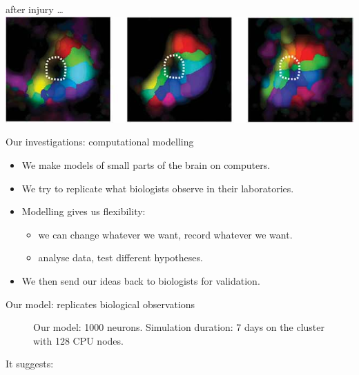 \begin{frame}[c]{after injury \ldots}
    \includegraphics[width=\textwidth]{99_images/keck-1-2c}%
\end{frame}
\begin{frame}[c]{Our investigations: computational modelling}
  \begin{itemize}
    \item We make \alert{models of small parts of the brain} on computers.
    \item We try to \alert{replicate} what biologists observe in their laboratories.
      \pause{}
    \item Modelling gives us \alert{flexibility}:
      \begin{itemize}
        \item we can change whatever we want, record whatever we want.
        \item analyse data, test different hypotheses.
      \end{itemize}
      \pause{}
    \item We then \alert{send our ideas back to biologists} for validation.
  \end{itemize}
\end{frame}
\begin{frame}[c]{Our model: replicates biological observations}
  \begin{figure}
      \centering
      \resizebox{\textwidth}{!}{}%
      \caption{Our model: 1000 neurons. Simulation duration: 7 days on the cluster with 128 CPU nodes.}
  \end{figure}
\end{frame}
\begin{frame}[c]{It suggests:}

\end{frame}

